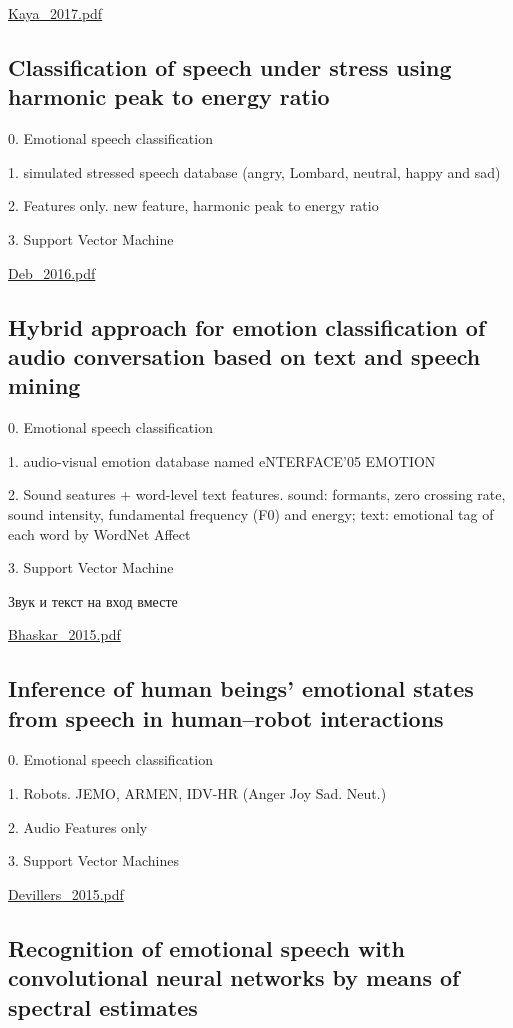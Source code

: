 \url{Kaya_2017.pdf}\cite{Kaya_2017}

\subsection{Classification of speech under stress using harmonic peak to energy ratio}

0. Emotional speech classification

1. simulated stressed speech database (angry, Lombard, neutral, happy and sad)

2. Features only. new feature, harmonic peak to energy ratio

3. Support Vector Machine

\url{Deb_2016.pdf}\cite{Deb_2016}

\subsection{Hybrid approach for emotion classification of audio conversation based on text and speech mining}

0. Emotional speech classification

1. audio-visual emotion database named eNTERFACE'05 EMOTION

2. Sound seatures + word-level text features. sound:  formants, zero crossing rate, sound intensity, fundamental frequency (F0) and  energy; text: emotional tag of each word by WordNet Affect

3. Support Vector Machine

Звук и текст на вход вместе

\url{Bhaskar_2015.pdf}\cite{Bhaskar_2015}

\subsection{Inference of human beings’ emotional states from speech in human--robot interactions}

0. Emotional speech classification

1. Robots. JEMO, ARMEN, IDV-HR (Anger Joy Sad. Neut.)

2. Audio Features only

3. Support Vector Machines

\url{Devillers_2015.pdf}\cite{Devillers_2015}

\subsection{Recognition of emotional speech with convolutional neural networks by means of spectral estimates}

